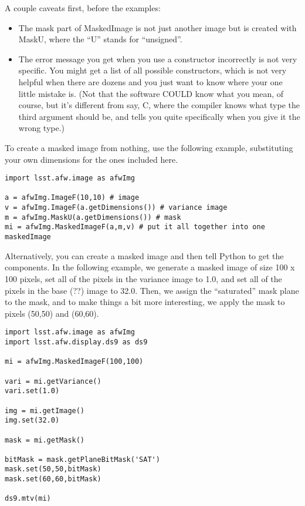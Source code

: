\documentclass{book}
\begin{document}
A couple caveats first, before the examples:
\begin{itemize}
\item The mask part of MaskedImage is not just another image but
is created with MaskU, where the ``U'' stands for ``unsigned''.
\item The error message you get when you use a constructor
incorrectly is not very specific.  You might get a list of all
possible constructors, which is not very helpful when there
are dozens and you just want to know where your one little mistake
is.  (Not that the software COULD know what you mean, of course,
but it's different from say, C, where the compiler knows what type
the third argument should be, and tells you quite specifically when you
give it the wrong type.)
\end{itemize}

To create a masked image from nothing, use the following example, substituting your own dimensions for the ones included here.

\begin{verbatim}
import lsst.afw.image as afwImg

a = afwImg.ImageF(10,10) # image
v = afwImg.ImageF(a.getDimensions()) # variance image
m = afwImg.MaskU(a.getDimensions()) # mask
mi = afwImg.MaskedImageF(a,m,v) # put it all together into one maskedImage
\end{verbatim}

Alternatively, you can create a masked image and then tell Python to get the components.  In the following example, we generate a masked image of size 100 x 100 pixels, set all of the pixels in the variance image to 1.0, and set all of the pixels in the base (??) image to 32.0.  Then, we assign the ``saturated'' mask plane to the mask, and to make things a bit more interesting, we apply the mask to pixels (50,50) and (60,60).  

\begin{verbatim}
import lsst.afw.image as afwImg
import lsst.afw.display.ds9 as ds9

mi = afwImg.MaskedImageF(100,100)

vari = mi.getVariance()
vari.set(1.0)

img = mi.getImage()
img.set(32.0)

mask = mi.getMask()

bitMask = mask.getPlaneBitMask('SAT')
mask.set(50,50,bitMask)
mask.set(60,60,bitMask)

ds9.mtv(mi)
\end{verbatim}
\end{document}
